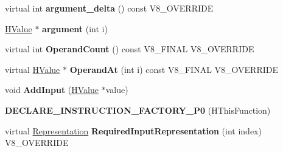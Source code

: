 \begin{DoxyCompactItemize}
\item 
\hypertarget{classv8_1_1internal_1_1_v8___f_i_n_a_l_a819f9fee628b487f878651a2f5b42a22}{}virtual int {\bfseries argument\+\_\+delta} () const V8\+\_\+\+O\+V\+E\+R\+R\+I\+D\+E\label{classv8_1_1internal_1_1_v8___f_i_n_a_l_a819f9fee628b487f878651a2f5b42a22}

\item 
\hypertarget{classv8_1_1internal_1_1_v8___f_i_n_a_l_a7133f837c9241dbbf84fb9fdad1bbd87}{}\hyperlink{classv8_1_1internal_1_1_h_value}{H\+Value} $\ast$ {\bfseries argument} (int i)\label{classv8_1_1internal_1_1_v8___f_i_n_a_l_a7133f837c9241dbbf84fb9fdad1bbd87}

\item 
\hypertarget{classv8_1_1internal_1_1_v8___f_i_n_a_l_a0d2595d0e78efb3f1d1ec04cc3ad18a2}{}virtual int {\bfseries Operand\+Count} () const V8\+\_\+\+F\+I\+N\+A\+L V8\+\_\+\+O\+V\+E\+R\+R\+I\+D\+E\label{classv8_1_1internal_1_1_v8___f_i_n_a_l_a0d2595d0e78efb3f1d1ec04cc3ad18a2}

\item 
\hypertarget{classv8_1_1internal_1_1_v8___f_i_n_a_l_a664d4133c087e10c33b0cda77484d983}{}virtual \hyperlink{classv8_1_1internal_1_1_h_value}{H\+Value} $\ast$ {\bfseries Operand\+At} (int i) const V8\+\_\+\+F\+I\+N\+A\+L V8\+\_\+\+O\+V\+E\+R\+R\+I\+D\+E\label{classv8_1_1internal_1_1_v8___f_i_n_a_l_a664d4133c087e10c33b0cda77484d983}

\item 
\hypertarget{classv8_1_1internal_1_1_v8___f_i_n_a_l_a527558444a4d1654479011c6a8f1913a}{}void {\bfseries Add\+Input} (\hyperlink{classv8_1_1internal_1_1_h_value}{H\+Value} $\ast$value)\label{classv8_1_1internal_1_1_v8___f_i_n_a_l_a527558444a4d1654479011c6a8f1913a}

\item 
\hypertarget{classv8_1_1internal_1_1_v8___f_i_n_a_l_ac8b1f50a906a8e88fd2a15044965ea9c}{}{\bfseries D\+E\+C\+L\+A\+R\+E\+\_\+\+I\+N\+S\+T\+R\+U\+C\+T\+I\+O\+N\+\_\+\+F\+A\+C\+T\+O\+R\+Y\+\_\+\+P0} (H\+This\+Function)\label{classv8_1_1internal_1_1_v8___f_i_n_a_l_ac8b1f50a906a8e88fd2a15044965ea9c}

\item 
\hypertarget{classv8_1_1internal_1_1_v8___f_i_n_a_l_a6c6d1f37f40b113d8f4062f1ffff7215}{}virtual \hyperlink{classv8_1_1internal_1_1_representation}{Representation} {\bfseries Required\+Input\+Representation} (int index) V8\+\_\+\+O\+V\+E\+R\+R\+I\+D\+E\label{classv8_1_1internal_1_1_v8___f_i_n_a_l_a6c6d1f37f40b113d8f4062f1ffff7215}


\end{DoxyCompactItemize}
